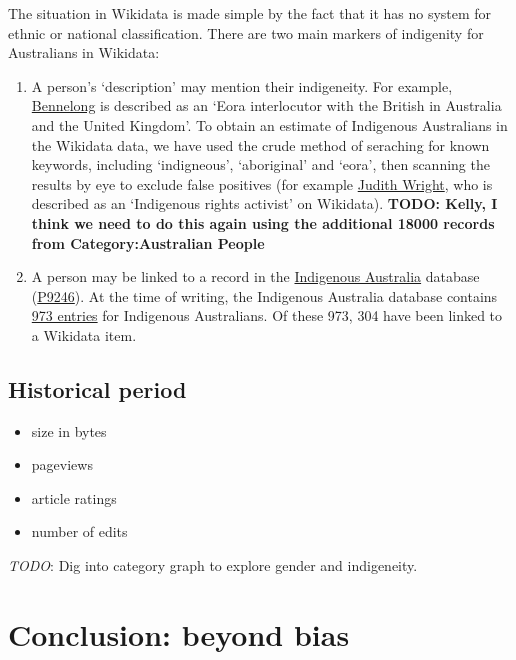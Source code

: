 \documentclass[
  a4paper,
  DIV=11,
  numbers=noendperiod]{scrreprt}
\providecommand{\tightlist}{%
  \setlength{\itemsep}{0pt}\setlength{\parskip}{0pt}}\usepackage{longtable,booktabs,array}
\begin{document}
The situation in Wikidata is made simple by the fact that it has no
system for ethnic or national classification. There are two main markers
of indigenity for Australians in Wikidata:

\begin{enumerate}
\def\labelenumi{\arabic{enumi}.}
\tightlist
\item
  A person's `description' may mention their indigeneity. For example,
  \href{https://www.wikidata.org/w/index.php?title=Q817828\&oldid=1617736683}{Bennelong}
  is described as an `Eora interlocutor with the British in Australia
  and the United Kingdom'. To obtain an estimate of Indigenous
  Australians in the Wikidata data, we have used the crude method of
  seraching for known keywords, including `indigneous', `aboriginal' and
  `eora', then scanning the results by eye to exclude false positives
  (for example \href{}{Judith Wright}, who is described as an
  `Indigenous rights activist' on Wikidata). \textbf{TODO: Kelly, I
  think we need to do this again using the additional 18000 records from
  Category:Australian People}
\item
  A person may be linked to a record in the
  \href{https://ia.anu.edu.au/}{Indigenous Australia} database
  (\href{https://www.wikidata.org/wiki/Property:P9246}{P9246}). At the
  time of writing, the Indigenous Australia database contains
  \href{https://ia.anu.edu.au/biographies/name/}{973 entries} for
  Indigenous Australians. Of these 973, 304 have been linked to a
  Wikidata item.
\end{enumerate}

\hypertarget{historical-period}{%
\section{Historical period}\label{historical-period}}

\begin{itemize}
\tightlist
\item
  size in bytes
\item
  pageviews
\item
  article ratings
\item
  number of edits
\end{itemize}

\emph{TODO}: Dig into category graph to explore gender and indigeneity.

\hypertarget{conclusion-beyond-bias}{%
\chapter{Conclusion: beyond bias}\label{conclusion-beyond-bias}}
\end{document}
